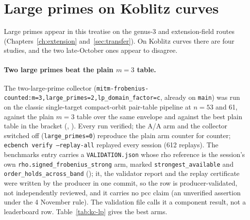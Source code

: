 \begin{table}[t]
\centering\small

\caption[]{Band means of counted $S$ in the routing retest, 24 verified runs
per arm and curve, at the six weights of \texttt{ecbench band} (GAE per
unpriced native operation). \texttt{pipeline71} is the withdrawn smaller
base $0.71c_0$. The descent has four uncounted native categories and is
priced only at $w=0$. Data: , from
 and
the five sibling \texttt{band-K-*.json} files.}
\label{tab:bin-routing-band}
\end{table}

\section{Large primes on Koblitz curves}\label{sec:kc-largeprime}

Large primes appear in this treatise on the genus-3 and extension-field
routes (Chapters~\ref{ch:extension} and~\ref{sec:transfer}). On Koblitz
curves there are four studies, and the two late-October ones appear to
disagree.

\paragraph{Two large primes beat the plain $m=3$ table.} The
two-large-prime collector
(\texttt{mitm-frobenius-counted:m=3,large\_primes=2,lp\_domain\_factor=c},
already on \texttt{main}) was run on the classic single-target
compact-orbit pair-table pipeline at $n=53$ and 61, against the plain
$m=3$ table over the same envelope and against the best plain table in the
bracket (,
). Every run
verified; the A/A arm and the collector switched off
(\texttt{large\_primes=0}) reproduce the plain arm counter for counter;
\texttt{ecbench verify --replay-all} replayed every session (612 replays).
The benchmarks entry carries a \texttt{VALIDATION.json} whose rho reference
is the session's own \texttt{rho.signed\_frobenius\_strong} arm, marked
\texttt{strongest\_available} and \texttt{order\_holds\_across\_band}
(); it, the
validator report and the replay certificate were written by the producer in
one commit, so the row is producer-validated, not independently reviewed,
and it carries no pcc claim (an unverified assertion under the 4 November
rule).
The validation file calls it a component result, not a leaderboard row.
Table~\ref{tab:kc-lp} gives the best arms.

